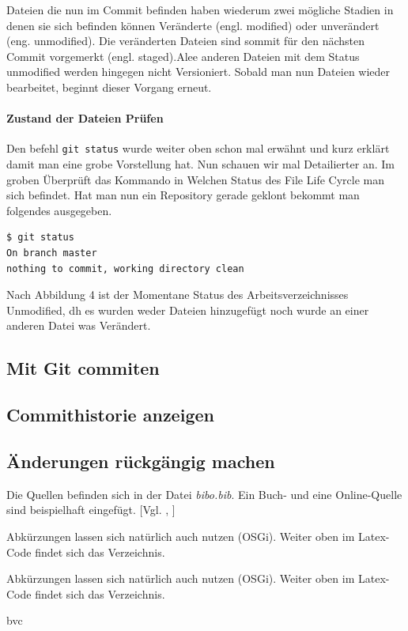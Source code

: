 \documentclass[12pt,a4paper,bibliography=totocnumbered,listof=totocnumbered]{scrartcl}
\begin{document}
Dateien die nun im Commit befinden haben wiederum zwei mögliche Stadien in denen sie sich befinden können Veränderte (engl. modified) oder unverändert (eng. unmodified). Die veränderten Dateien sind sommit für den nächsten Commit vorgemerkt (engl. staged).Alee anderen Dateien mit dem Status unmodified werden hingegen nicht Versioniert. Sobald man nun Dateien wieder bearbeitet, beginnt dieser Vorgang erneut.

\paragraph{Zustand der Dateien Prüfen}
Den befehl \lstinline|git status| wurde weiter oben schon mal erwähnt und kurz erklärt damit man eine grobe Vorstellung hat. Nun schauen wir mal Detailierter an. Im groben Überprüft das Kommando in Welchen Status des File Life Cyrcle man sich befindet. Hat man nun ein Repository gerade geklont bekommt man folgendes ausgegeben.

\vspace{1em}
\begin{lstlisting}[caption=Git Statusbefehl nach git clone befehl, label=lst:arduino]
$ git status
On branch master
nothing to commit, working directory clean 
\end{lstlisting}

Nach Abbildung 4 ist der Momentane Status des Arbeitsverzeichnisses Unmodified, dh 
es wurden weder Dateien hinzugefügt noch wurde an einer anderen Datei was Verändert.  

\subsection{ Mit Git commiten}
\subsection{Commithistorie anzeigen}
\subsection{ Änderungen rückgängig machen}
Die Quellen befinden sich in der Datei \textit{bibo.bib}. Ein Buch- und eine Online-Quelle sind beispielhaft eingefügt. [Vgl. \cite{buch}, \cite{online}]

Abkürzungen lassen sich natürlich auch nutzen (\ac{OSGi}). Weiter oben im Latex-Code findet sich das Verzeichnis.


Abkürzungen lassen sich natürlich auch nutzen (\ac{OSGi}). Weiter oben im Latex-Code findet sich das Verzeichnis.
\begin{scriptsize}
bvc
\end{scriptsize}
\pagebreak
\end{document}
